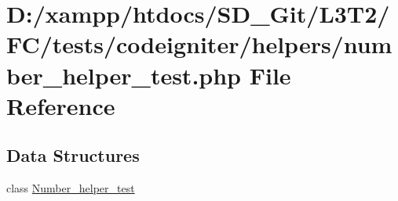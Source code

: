 \hypertarget{number__helper__test_8php}{}\section{D\+:/xampp/htdocs/\+S\+D\+\_\+\+Git/\+L3\+T2/\+F\+C/tests/codeigniter/helpers/number\+\_\+helper\+\_\+test.php File Reference}
\label{number__helper__test_8php}
\subsection*{Data Structures}
\begin{DoxyCompactItemize}
\item 
class \hyperlink{class_number__helper__test}{Number\+\_\+helper\+\_\+test}
\end{DoxyCompactItemize}
